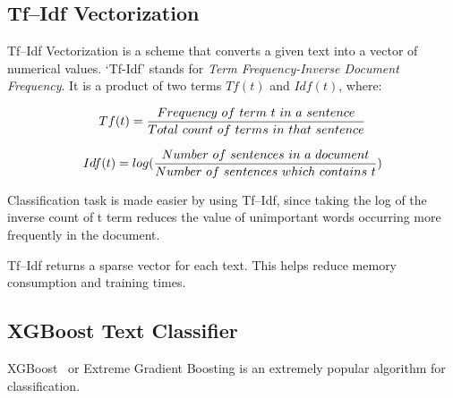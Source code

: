 \documentclass[conference]{IEEEtran}
\begin{document}
\subsection{Tf--Idf Vectorization}\label{subsec-tf-idf}
Tf--Idf Vectorization is a scheme that converts a given text into a vector of numerical values. `Tf-Idf' stands for \emph{Term Frequency-Inverse Document Frequency}. It is a product of two terms $Tf(t)$ and $Idf(t)$, where:

\begin{equation*}
    Tf(t) = \frac{Frequency\ of\ term\ t\ in\ a\ sentence}{Total\ count\ of\ terms\ in\ that\ sentence} \bigskip
\end{equation*}


\begin{equation*}
    Idf(t) = log(\frac{Number\ of\ sentences\ in\ a\ document}{ Number\ of\ sentences\ which\ contains\ t})\bigskip
\end{equation*}

Classification task is made easier by using Tf--Idf, since taking the log of the inverse count of t term reduces the value of unimportant words occurring more frequently in the document.

Tf--Idf returns a sparse vector for each text. This helps reduce memory consumption and training times.

\subsection{XGBoost Text Classifier}\label{subsec-xgb}
XGBoost~\cite{chen2016xgboost} or Extreme Gradient Boosting is an extremely popular algorithm for classification. 
\end{document}
